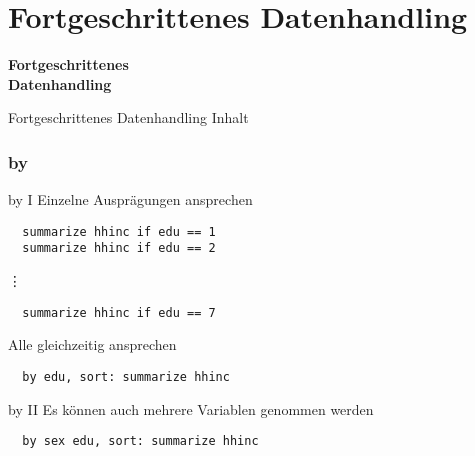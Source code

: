 \part{Fortgeschrittenes Datenhandling}
\begin{frame}
\thispagestyle{empty}
\textbf{\huge{Fortgeschrittenes\\ Datenhandling}}
\end{frame}

\begin{frame}{Fortgeschrittenes Datenhandling Inhalt}
 \tableofcontents
\end{frame}

\section{by}
\begin{frame}[fragile]{by I}  
Einzelne Ausprägungen ansprechen
\begin{lstlisting}
  summarize hhinc if edu == 1
  summarize hhinc if edu == 2
\end{lstlisting}
\hspace{1cm}\vdots
\begin{lstlisting}
  summarize hhinc if edu == 7
\end{lstlisting}

Alle gleichzeitig ansprechen
\begin{lstlisting}
  by edu, sort: summarize hhinc
\end{lstlisting}

\end{frame}

\begin{frame}[fragile]{by II}
Es können auch mehrere Variablen genommen werden 
\begin{lstlisting}
  by sex edu, sort: summarize hhinc
\end{lstlisting}
\end{frame}

